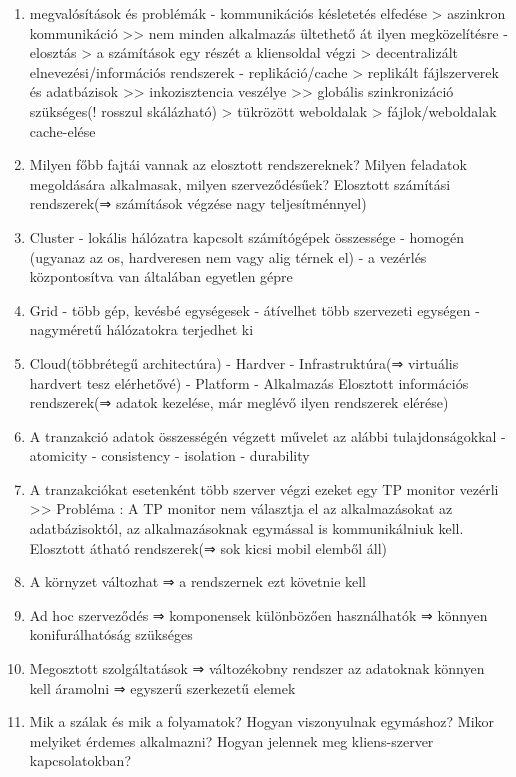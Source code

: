 \documentclass[twoside, a4paper, 12pt]{article}
\begin{document}
\begin{enumerate}
    \item megvalósítások és problémák 
        - kommunikációs késletetés elfedése 
        > aszinkron kommunikáció >> nem minden alkalmazás ültethető át ilyen megközelítésre
        - elosztás 
        > a számítások egy részét a kliensoldal végzi
        > decentralizált elnevezési/információs rendszerek
        - replikáció/cache
        > replikált fájlszerverek és adatbázisok >> inkozisztencia veszélye >> globális szinkronizáció szükséges(! rosszul skálázható)
        > tükrözött weboldalak
        > fájlok/weboldalak cache-elése
    \item  Milyen főbb fajtái vannak az elosztott rendszereknek? Milyen feladatok megoldására alkalmasak, milyen szerveződésűek?
        Elosztott számítási rendszerek(⇒ számítások végzése nagy teljesítménnyel)
    \item Cluster
        - lokális hálózatra kapcsolt számítógépek összessége 
        - homogén (ugyanaz az os, hardveresen nem vagy alig térnek el)
        - a vezérlés központosítva van általában egyetlen gépre
    \item Grid
        - több gép, kevésbé egységesek
        - átívelhet több szervezeti egységen 
        - nagyméretű hálózatokra terjedhet ki 
    \item Cloud(többrétegű architectúra)
        - Hardver
        - Infrastruktúra(⇒ virtuális hardvert tesz elérhetővé)
        - Platform
        - Alkalmazás
        Elosztott információs rendszerek(⇒  adatok kezelése, már meglévő ilyen rendszerek elérése)
    \item A tranzakció adatok összességén végzett művelet az alábbi tulajdonságokkal
        - atomicity
        - consistency
        - isolation
        - durability
    \item A tranzakciókat esetenként több szerver végzi ezeket egy TP monitor vezérli 
        >> Probléma :  A TP monitor nem választja el az alkalmazásokat az adatbázisoktól,  az alkalmazásoknak egymással is kommunikálniuk kell.
        Elosztott átható rendszerek(⇒ sok kicsi mobil elemből áll)
    \item A környzet változhat ⇒ a rendszernek ezt követnie kell
    \item Ad hoc szerveződés ⇒ komponensek különbözően használhatók ⇒ könnyen konifurálhatóság szükséges
    \item Megosztott szolgáltatások ⇒ változékobny rendszer az adatoknak könnyen kell áramolni ⇒ egyszerű szerkezetű elemek
    \item  Mik a szálak és mik a folyamatok? Hogyan viszonyulnak egymáshoz? Mikor melyiket érdemes alkalmazni? Hogyan jelennek meg kliens-szerver kapcsolatokban?	

\end{enumerate}
\end{document}
